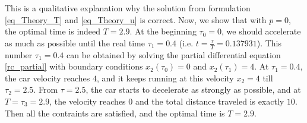 



This is a qualitative explanation why the solution from formulation \ref{eq_Theory_T} and \ref{eq_Theory_u} is correct. Now, we show that with $p=0$, the optimal time is indeed $T=2.9$. At the beginning $\tau_0 = 0$,  we should accelerate as much as possible until the real time $\tau_1=0.4$ (i.e. $t= \frac{\tau}{T} = 0.137931$). This number $\tau_1=0.4$ can be obtained by solving the partial differential equation \ref{rc_partial} with boundary conditions $x_2(\tau_0)=0$ and $x_2(\tau_1)=4$. At $\tau_1=0.4$, the car velocity reaches $4$, and it keeps running at this velocity $x_2=4$ till $\tau_2=2.5$. From $\tau=2.5$, the car starts to decelerate as strongly as possible, and at $T=\tau_3=2.9$, the velocity reaches $0$ and the total distance traveled is exactly $10$. Then all the contraints are satisfied, and the optimal time is $T=2.9$. 

